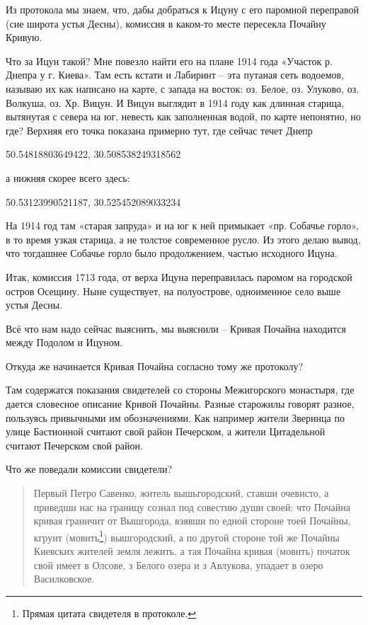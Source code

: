 Из протокола мы знаем, что, дабы добраться к Ицуну с его паромной переправой (сие широта устья Десны), комиссия в каком-то месте пересекла Почайну Кривую.

Что за Ицун такой? Мне повезло найти его на плане 1914 года «Участок р. Днепра у г. Киева». Там есть кстати и Лабиринт – эта путаная сеть водоемов, называю их как написано на карте, с запада на восток: оз. Белое, оз. Улуково, оз. Волкуша, оз. Хр. Вицун. И Вицун выглядит в 1914 году как длинная старица, вытянутая с севера на юг, невесть как заполненная водой, по карте непонятно, но где? Верхняя его точка показана примерно тут, где сейчас течет Днепр

50.54818803649422, 30.508538249318562

а нижняя скорее всего здесь:

50.53123990521187, 30.525452089033234

На 1914 год там «старая запруда» и на юг к ней примыкает «пр. Собачье горло», в то время узкая старица, а не толстое современное русло. Из этого делаю вывод, что тогдашнее Собачье горло было продолжением, частью исходного Ицуна.

Итак, комиссия 1713 года, от верха Ицуна переправилась паромом на городской остров Осещину. Ныне существует, на полуострове,  одноименное село выше устья Десны.

Всё что нам надо сейчас выяснить, мы выяснили – Кривая Почайна находится между Подолом и Ицуном. 

Откуда же начинается Кривая Почайна согласно тому же протоколу?

Там содержатся показания свидетелей со стороны Межигорского монастыря, где дается словесное описание Кривой Почайны. Разные старожилы говорят разное, пользуясь привычными им обозначениями. Как например жители Зверинца по улице Бастионной считают свой район Печерском, а жители Цитадельной считают Печерском свой район.

Что же поведали комиссии свидетели?

\begin{quotation}
Первый Петро Савенко, житель вышьгородский, ставши очевисто, а приведши нас на границу сознал под совестию души своей: что Почайна кривая граничит от Вышгорода, взявши по едной стороне тоей Почайны, кгрунт (мовить\footnote{Прямая цитата свидетеля в протоколе.}) вышгородский, а по другой стороне той же Почайны Киевских жителей земля лежить, а тая Почайна кривая (мовить) початок свой имеет в Олсове, з Белого озера и з Авлукова, упадает в озеро Василковское.
\end{quotation}
 
